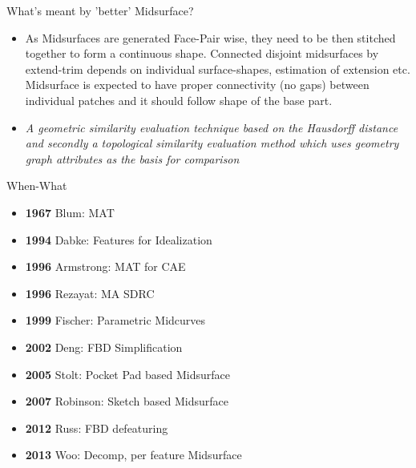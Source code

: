 \begin{frame}[<+-| alert@+>]{What's meant by 'better' Midsurface?}
\begin{itemize}[noitemsep,label=\textbullet,topsep=2pt,parsep=2pt,partopsep=2pt]
\item As Midsurfaces are generated Face-Pair wise, they need to be then stitched together to form a continuous shape. Connected  disjoint midsurfaces by extend-trim depends on individual surface-shapes, estimation of extension etc. Midsurface is expected to have proper connectivity  (no gaps) between individual patches and it should follow shape of the base part.
\item {\it A geometric similarity evaluation technique based on the Hausdorff distance and secondly a topological similarity evaluation method which uses geometry graph attributes as the basis for comparison} \cite{Lockett2008}
\end{itemize}
\end{frame}

\begin{frame}{When-What}
\begin{itemize}[noitemsep,label=\textbullet,topsep=2pt,parsep=2pt,partopsep=2pt]
\item \textbf{1967} Blum: MAT
\item \textbf{1994} Dabke: Features for Idealization
\item \textbf{1996} Armstrong: MAT for CAE
\item \textbf{1996} Rezayat: MA SDRC
\item \textbf{1999} Fischer: Parametric Midcurves
\item \textbf{2002} Deng: FBD Simplification
\item \textbf{2005} Stolt: Pocket Pad based Midsurface
\item \textbf{2007} Robinson: Sketch based Midsurface
\item \textbf{2012} Russ: FBD defeaturing
\item \textbf{2013} Woo: Decomp, per feature Midsurface
\end{itemize}


\end{frame}



